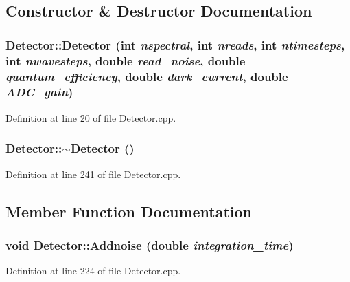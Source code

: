 \subsection{Constructor \& Destructor Documentation}
\hypertarget{classDetector_a59e4a9ab2c51505abae515442940f58d}{
\subsubsection[{Detector}]{\setlength{\rightskip}{0pt plus 5cm}Detector::Detector (int {\em nspectral}, \/  int {\em nreads}, \/  int {\em ntimesteps}, \/  int {\em nwavesteps}, \/  double {\em read\_\-noise}, \/  double {\em quantum\_\-efficiency}, \/  double {\em dark\_\-current}, \/  double {\em ADC\_\-gain})}}
\label{classDetector_a59e4a9ab2c51505abae515442940f58d}


Definition at line 20 of file Detector.cpp.

\hypertarget{classDetector_ae16b7bf62f39cb287927d56ca17663d7}{
\subsubsection[{$\sim$Detector}]{\setlength{\rightskip}{0pt plus 5cm}Detector::$\sim$Detector ()}}
\label{classDetector_ae16b7bf62f39cb287927d56ca17663d7}


Definition at line 241 of file Detector.cpp.



\subsection{Member Function Documentation}
\hypertarget{classDetector_a266b4ed766484ef67e533bd163d5b597}{
\subsubsection[{Addnoise}]{\setlength{\rightskip}{0pt plus 5cm}void Detector::Addnoise (double {\em integration\_\-time})}}
\label{classDetector_a266b4ed766484ef67e533bd163d5b597}


Definition at line 224 of file Detector.cpp.


